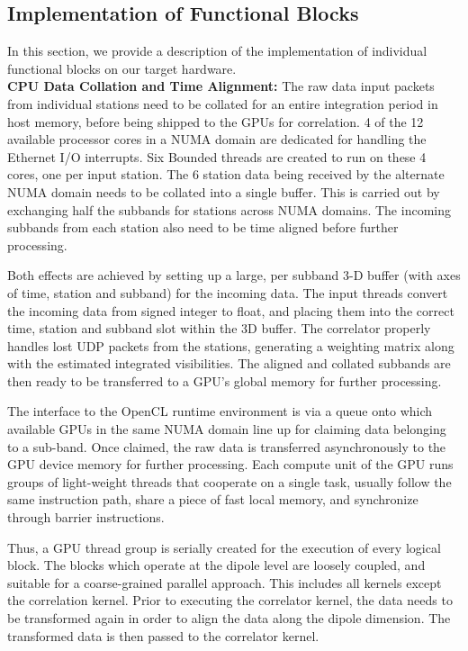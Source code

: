 \documentclass{ws-jai}
\begin{document}
\subsection {Implementation of Functional  Blocks} 

In this  section, we provide a  description of the implementation  of individual
functional blocks on our target hardware.\\

\noindent \textbf  {CPU Data Collation and  Time Alignment:} The raw  data input
packets from individual  stations need to be collated for  an entire integration
period in host memory,  before being shipped to the GPUs  for correlation.  4 of
the  12  available processor  cores  in  a NUMA  domain  are dedicated for handling the 
 Ethernet I/O interrupts.  Six Bounded threads
are created to run  on these 4 cores, one per input station.  The 6 station data
being received by the  alternate NUMA domain needs to be  collated into a single
buffer. This is carried out by  exchanging half the subbands for stations across
NUMA domains.   The incoming  subbands from  each station also  need to  be time
aligned before further processing.

Both effects are  achieved by setting up  a large, per subband  3-D buffer (with
axes of  time, station  and subband)  for the incoming  data. The  input threads
convert the  incoming data from signed  integer to float, and  placing them into
the correct time, station and subband slot within the 3D buffer.  The correlator
properly  handles lost  UDP packets  from the  stations, generating  a weighting
matrix  along  with the  estimated  integrated  visibilities.  The  aligned  and
collated subbands are then ready to be  transferred to a GPU's global memory for
further processing.

The  interface to  the OpenCL  runtime  environment is  via a  queue onto  which
available GPUs in the same NUMA domain  line up for claiming data belonging to a
sub-band.  Once claimed,  the raw data is transferred asynchronously  to the GPU
device memory for  further processing. Each compute unit of  the GPU runs groups
of light-weight threads that cooperate on a single task, usually follow the same
instruction path,  share a piece of  fast local memory, and  synchronize through
barrier instructions.

Thus, a GPU thread group is serially  created for the execution of every logical
block.  The  blocks which operate at  the dipole level are  loosely coupled, and
suitable  for a  coarse-grained parallel  approach.  This  includes all  kernels
except the  correlation kernel.  Prior to executing  the correlator  kernel, the
data needs to be  transformed again in order to align the  data along the dipole
dimension. The transformed data is then passed to the correlator kernel.
\end{document}

